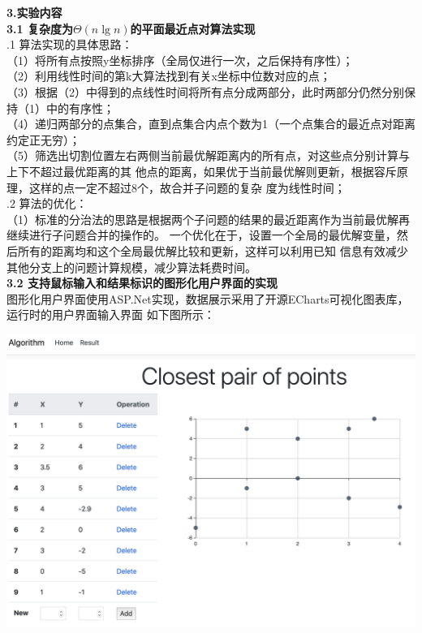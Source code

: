 \documentclass[a4paper]{article}
\begin{document}
\begin{enumerate}
  \textbf{3.实验内容}\\
  \textbf{3.1 复杂度为$\Theta(n\lg n)$的平面最近点对算法实现}\\
  .1 算法实现的具体思路：\\
  （1）将所有点按照y坐标排序（全局仅进行一次，之后保持有序性）；\\
  （2）利用线性时间的第k大算法找到有关x坐标中位数对应的点；\\
  （3）根据（2）中得到的点线性时间将所有点分成两部分，此时两部分仍然分别保持（1）中的有序性；\\
  （4）递归两部分的点集合，直到点集合内点个数为1（一个点集合的最近点对距离约定正无穷）；\\
  （5）筛选出切割位置左右两侧当前最优解距离内的所有点，对这些点分别计算与上下不超过最优距离的其
  他点的距离，如果优于当前最优解则更新，根据容斥原理，这样的点一定不超过8个，故合并子问题的复杂
  度为线性时间；\\
  .2 算法的优化：\\
  （1）标准的分治法的思路是根据两个子问题的结果的最近距离作为当前最优解再继续进行子问题合并的操作的。
  一个优化在于，设置一个全局的最优解变量，然后所有的距离均和这个全局最优解比较和更新，这样可以利用已知
  信息有效减少其他分支上的问题计算规模，减少算法耗费时间。\\
  \medskip
  \textbf{3.2 支持鼠标输入和结果标识的图形化用户界面的实现}\\
  \medskip
  图形化用户界面使用ASP.Net实现，数据展示采用了开源ECharts可视化图表库，运行时的用户界面输入界面
  如下图所示：
  \bigskip
  \begin{center}
    \includegraphics[scale=0.3]{Pictures/cpop1.png}

\end{center}
\end{enumerate}
\end{document}
